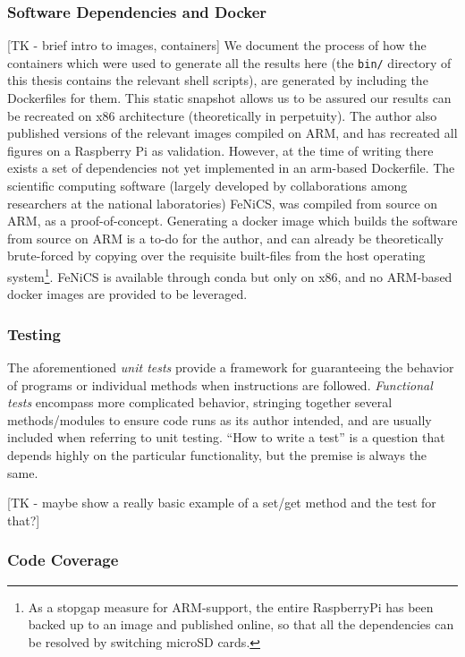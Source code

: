 \subsubsection{Software Dependencies and Docker}\label{sec:docker}
[TK - brief intro to images, containers]
We document the process of how the containers which were used to generate all the results here (the {\tt bin/} directory of this thesis contains the relevant shell scripts), are generated by including the Dockerfiles for them.
This static snapshot allows us to be assured our results can be recreated on x86 architecture (theoretically in perpetuity).
The author also published versions of the relevant images compiled on ARM, and has recreated all figures on a Raspberry Pi as validation.
However, at the time of writing there exists a set of dependencies not yet implemented in an arm-based Dockerfile.
The scientific computing software (largely developed by collaborations among researchers at the national laboratories) FeNiCS, was compiled from source on ARM, as a proof-of-concept.
Generating a docker image which builds the software from source on ARM is a to-do for the author, and can already be theoretically brute-forced by copying over the requisite built-files from the host operating system\footnote{As a stopgap measure for ARM-support, the entire RaspberryPi has been backed up to an image and published online, so that all the dependencies can be resolved by switching microSD cards.}.
FeNiCS is available through conda but only on x86, and no ARM-based docker images are provided to be leveraged.


\subsubsection{Testing}\label{sec:unit-testing}
The aforementioned \emph{unit tests} provide a framework for guaranteeing the behavior of programs or individual methods when instructions are followed.
\emph{Functional tests} encompass more complicated behavior, stringing together several methods/modules to ensure code runs as its author intended, and are usually included when referring to unit testing.
``How to write a test'' is a question that depends highly on the particular functionality, but the premise is always the same.

[TK - maybe show a really basic example of a set/get method and the test for that?]


\subsubsection{Code Coverage}\label{sec:code-coverage}


